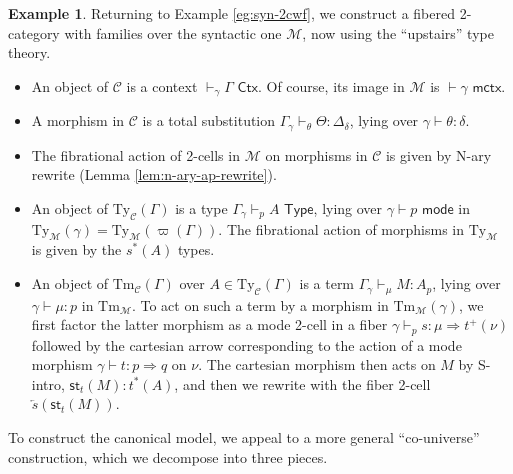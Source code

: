 \documentclass[10pt]{article}
\theoremstyle{definition}
\newtheorem{example}{Example}
\newcommand{\yields}{\vdash}
\newcommand{\tcell}{\Rightarrow}
\newcommand{\CTX}{\,\,\mathsf{Ctx}}
\newcommand{\ctx}{\,\,\mathsf{mctx}}
\newcommand{\TYPE}{\,\,\mathsf{Type}}
\newcommand{\type}{\,\,\mathsf{mode}}
\newcommand{\rewrite}[2]{\overleftarrow{#1}(#2)}
\newcommand\St[2]{\ensuremath{{#1}^*(#2)}}
\newcommand\StI[2]{\ensuremath{\mathsf{st}_{#1}(#2)}}
\newcommand\TypeTwo[4]{\ensuremath{#1 \vdash #2 :  #3 \tcell #4}}
\newcommand\TermTwoT[5]{\ensuremath{#1 \vdash_{#5} {#2} : #3 \tcell #4}}
\newcommand\TrPlus[2]{\ensuremath{{#1}^+(#2)}}
\newcommand\M{\mathcal{M}}
\newcommand\Mty{{\mathrm{Ty}_{\M}}}
\newcommand\Mtm{{\mathrm{Tm}_{\M}}}
\newcommand\C{\mathcal{C}}
\newcommand\Cty{\mathrm{Ty}_{\C}}
\newcommand\Ctm{\mathrm{Tm}_{\C}}
\newcommand\vp{\varpi}
\begin{document}
\begin{example}\label{eg:syn-fib-2cwf}
  Returning to Example \ref{eg:syn-2cwf}, we construct a fibered 2-category with families over the syntactic one $\M$, now using the ``upstairs'' type theory.
  \begin{itemize}
  \item An object of $\C$ is a context $\yields_\gamma \Gamma \CTX$.
    Of course, its image in $\M$ is $\yields \gamma \ctx$.
  \item A morphism in $\C$ is a total substitution $\Gamma_{\gamma} \yields_\theta \Theta : \Delta_\delta$, lying over $\gamma \yields \theta : \delta$.
  \item The fibrational action of 2-cells in $\M$ on morphisms in $\C$ is given by N-ary rewrite (Lemma \ref{lem:n-ary-ap-rewrite}).
  \item An object of $\Cty(\Gamma)$ is a type $\Gamma_\gamma \yields_p A \TYPE$, lying over $\gamma \yields p\type$ in $\Mty(\gamma) = \Mty(\vp(\Gamma))$.
    The fibrational action of morphisms in $\Mty$ is given by the $\St{s}{A}$ types.
  \item An object of $\Ctm(\Gamma)$ over $A\in \Cty(\Gamma)$ is a term $\Gamma_\gamma \yields_\mu M:A_p$, lying over $\gamma \yields \mu:p$ in $\Mtm$.
    To act on such a term by a morphism in $\Mtm(\gamma)$, we first factor the latter morphism as a mode 2-cell in a fiber $\TermTwoT{\gamma}{s}{\mu}{\TrPlus{t}{\nu}}{p}$ followed by the cartesian arrow corresponding to the action of a mode morphism $\TypeTwo{\gamma}{t}{p}{q}$ on $\nu$.
    The cartesian morphism then acts on $M$ by S-intro, $\StI{t}{M} : \St{t}{A}$, and then we rewrite with the fiber 2-cell $\rewrite{s}{\StI{t}{M}}$.
  \end{itemize}
\end{example}

To construct the canonical model, we appeal to a more general ``co-universe'' construction, which we decompose into three pieces.
\end{document}
